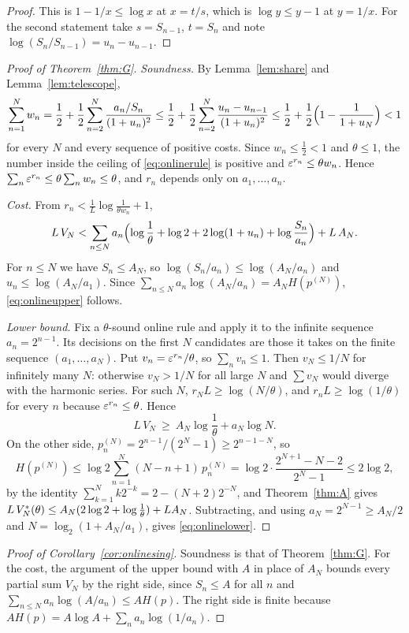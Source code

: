 \begin{proof}
This is $1-1/x\le\log x$ at $x=t/s$, which is $\log y\le y-1$ at $y=1/x$. For the second statement take $s=S_{n-1}$, $t=S_{n}$ and note $\log(S_{n}/S_{n-1})=u_{n}-u_{n-1}$.
\end{proof}

\begin{proof}[Proof of Theorem~\ref{thm:G}]
\emph{Soundness.} By Lemma~\ref{lem:share} and Lemma~\ref{lem:telescope},
\[
\sum_{n=1}^{N}w_{n}=\frac12+\frac12\sum_{n=2}^{N}\frac{a_{n}/S_{n}}{(1+u_{n})^{2}}\le\frac12+\frac12\sum_{n=2}^{N}\frac{u_{n}-u_{n-1}}{(1+u_{n})^{2}}\le\frac12+\frac12\Bigl(1-\frac1{1+u_{N}}\Bigr)<1
\]
for every $N$ and every sequence of positive costs. Since $w_{n}\le\frac12<1$ and $\theta\le1$, the number inside the ceiling of \eqref{eq:onlinerule} is positive and $\varepsilon^{r_{n}}\le\theta w_{n}$. Hence $\sum_{n}\varepsilon^{r_{n}}\le\theta\sum_{n}w_{n}\le\theta$, and $r_{n}$ depends only on $a_{1},\dots,a_{n}$.

\emph{Cost.} From $r_{n}<\frac1L\log\frac1{\theta w_{n}}+1$,
\[
L\,V_{N}<\sum_{n\le N}a_{n}\Bigl(\log\frac1\theta+\log2+2\log(1+u_{n})+\log\frac{S_{n}}{a_{n}}\Bigr)+L\,A_{N}.
\]
For $n\le N$ we have $S_{n}\le A_{N}$, so $\log(S_{n}/a_{n})\le\log(A_{N}/a_{n})$ and $u_{n}\le\log(A_{N}/a_{1})$. Since $\sum_{n\le N}a_{n}\log(A_{N}/a_{n})=A_{N}H(p^{(N)})$, \eqref{eq:onlineupper} follows.

\emph{Lower bound.} Fix a $\theta$-sound online rule and apply it to the infinite sequence $a_{n}=2^{n-1}$. Its decisions on the first $N$ candidates are those it takes on the finite sequence $(a_{1},\dots,a_{N})$. Put $v_{n}=\varepsilon^{r_{n}}/\theta$, so $\sum_{n}v_{n}\le1$. Then $v_{N}\le1/N$ for infinitely many $N$: otherwise $v_{N}>1/N$ for all large $N$ and $\sum v_{N}$ would diverge with the harmonic series. For such $N$, $r_{N}L\ge\log(N/\theta)$, and $r_{n}L\ge\log(1/\theta)$ for every $n$ because $\varepsilon^{r_{n}}\le\theta$. Hence
\[
L\,V_{N}\ \ge\ A_{N}\log\frac1\theta+a_{N}\log N .
\]
On the other side, $p^{(N)}_{n}=2^{n-1}/(2^{N}-1)\ge2^{n-1-N}$, so
\[
H(p^{(N)})\le\log2\sum_{n=1}^{N}(N-n+1)\,p^{(N)}_{n}=\log2\cdot\frac{2^{N+1}-N-2}{2^{N}-1}\le2\log2,
\]
by the identity $\sum_{k=1}^{N}k2^{-k}=2-(N+2)2^{-N}$, and Theorem~\ref{thm:A} gives $L\,V^{*}_{N}(\theta)\le A_{N}(2\log2+\log\frac1\theta)+LA_{N}$. Subtracting, and using $a_{N}=2^{N-1}\ge A_{N}/2$ and $N=\log_{2}(1+A_{N}/a_{1})$, gives \eqref{eq:onlinelower}.
\end{proof}

\begin{proof}[Proof of Corollary~\ref{cor:onlinesing}]
Soundness is that of Theorem~\ref{thm:G}. For the cost, the argument of the upper bound with $A$ in place of $A_{N}$ bounds every partial sum $V_{N}$ by the right side, since $S_{n}\le A$ for all $n$ and $\sum_{n\le N}a_{n}\log(A/a_{n})\le AH(p)$. The right side is finite because $AH(p)=A\log A+\sum_{n}a_{n}\log(1/a_{n})$.
\end{proof}

